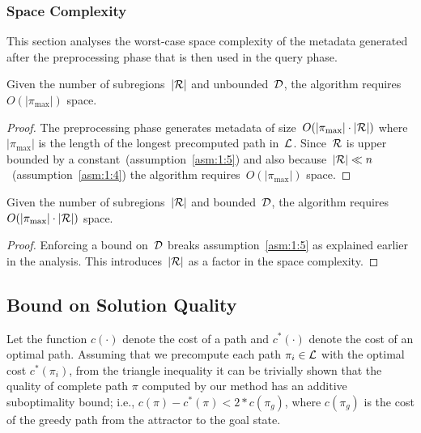 \documentclass[a4paper]{report}
\begin{document}
\subsubsection{Space Complexity}
This section analyses the worst-case space complexity of the metadata generated after the preprocessing phase that is then used in the query phase.
\vspace{2mm}
\begin{lemma}
	Given the number of subregions~$|\mathcal{R}|$ and unbounded~$\mathcal{D}$, the algorithm requires~$O(|\pi_{\text{max}}|)$ space.
\end{lemma}
\begin{proof}
	The preprocessing phase generates metadata of size~$O(|\pi_{\text{max}}| \cdot |\mathcal{R}|)$ where $|\pi_{\text{max}}|$ is the length of the longest precomputed path in~$\mathcal{L}$. Since~$\mathcal{R}$ is upper bounded by a constant~(assumption~\ref{asm:1:5}) and also because~$|\mathcal{R}| \ll n$~(assumption~\ref{asm:1:4}) the algorithm requires~$O(|\pi_{\text{max}}|)$ space.
\end{proof}

\vspace{2mm}
\begin{lemma}
	Given the number of subregions~$|\mathcal{R}|$ and bounded~$\mathcal{D}$, the algorithm requires~$O(|\pi_{\text{max}}| \cdot |\mathcal{R}|)$ space.
\end{lemma}
\begin{proof}
	Enforcing a bound on~$\mathcal{D}$ breaks assumption~\ref{asm:1:5} as explained earlier in the analysis. This introduces~$|\mathcal{R}|$ as a factor in the space complexity.
\end{proof}



\subsection{Bound on Solution Quality}
\label{subsec:quality}
Let the function $c(\cdot)$ denote the cost of a path and $c^*(\cdot)$ denote the cost of an optimal path. Assuming that we precompute each path $\pi_i \in \mathcal{L}$ with the optimal cost $c^*(\pi_i)$, from the triangle inequality it can be trivially shown that the quality of complete path $\pi$ computed by our method has an additive suboptimality bound; i.e.,
 $c(\pi) - c^*(\pi) < 2 * c(\pi_g)$,
where $c(\pi_g)$ is the cost of the greedy path from the attractor to the goal state.
\end{document}
